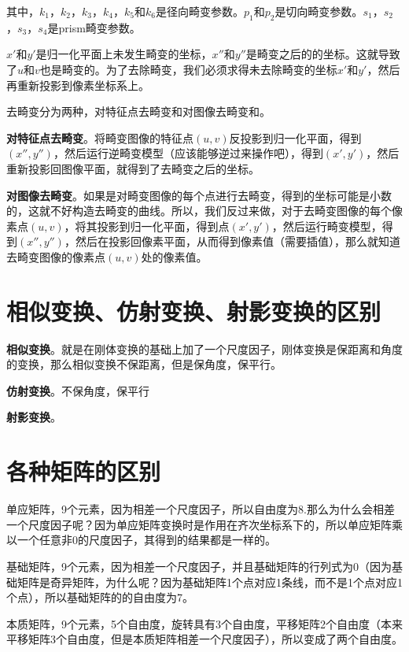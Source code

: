 其中，$k_1$，$k_2$，$k_3$，$k_4$，$k_5$和$k_6$是径向畸变参数。$p_1$和$p_2$是切向畸变参数。$s_1$，$s_2$，$s_3$，$s_4$是prism畸变参数。


$x'$和$y'$是归一化平面上未发生畸变的坐标，$x''$和$y''$是畸变之后的的坐标。这就导致了$u$和$v$也是畸变的。为了去除畸变，我们必须求得未去除畸变的坐标$x'$和$y'$，然后再重新投影到像素坐标系上。

去畸变分为两种，对特征点去畸变和对图像去畸变和。

\textbf{对特征点去畸变}。将畸变图像的特征点$(u, v)$反投影到归一化平面，得到$(x'', y'')$，然后运行逆畸变模型（应该能够逆过来操作吧），得到$(x', y')$，然后重新投影回图像平面，就得到了去畸变之后的坐标。

\textbf{对图像去畸变}。如果是对畸变图像的每个点进行去畸变，得到的坐标可能是小数的，这就不好构造去畸变的曲线。所以，我们反过来做，对于去畸变图像的每个像素点$(u, v)$，将其投影到归一化平面，得到点$(x', y')$，然后运行畸变模型，得到$(x'', y'')$，然后在投影回像素平面，从而得到像素值（需要插值），那么就知道去畸变图像的像素点$(u, v)$处的像素值。



\section{相似变换、仿射变换、射影变换的区别}
\textbf{相似变换}。就是在刚体变换的基础上加了一个尺度因子，刚体变换是保距离和角度的变换，那么相似变换不保距离，但是保角度，保平行。

\textbf{仿射变换}。不保角度，保平行

\textbf{射影变换}。






\section{各种矩阵的区别}


单应矩阵，9个元素，因为相差一个尺度因子，所以自由度为8.那么为什么会相差一个尺度因子呢？因为单应矩阵变换时是作用在齐次坐标系下的，所以单应矩阵乘以一个任意非0的尺度因子，其得到的结果都是一样的。

基础矩阵，9个元素，因为相差一个尺度因子，并且基础矩阵的行列式为0（因为基础矩阵是奇异矩阵，为什么呢？因为基础矩阵1个点对应1条线，而不是1个点对应1个点），所以基础矩阵的的自由度为7。

本质矩阵，9个元素，5个自由度，旋转具有3个自由度，平移矩阵2个自由度（本来平移矩阵3个自由度，但是本质矩阵相差一个尺度因子），所以变成了两个自由度。


